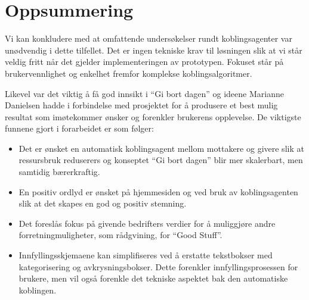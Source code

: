 \section{Oppsummering}
Vi kan konkludere med at omfattende undersøkelser rundt koblingsagenter var unødvendig i dette tilfellet. Det er ingen tekniske krav til løsningen slik at vi står veldig fritt når det gjelder implementeringen av prototypen. Fokuset står på brukervennlighet og enkelhet fremfor komplekse koblingsalgoritmer.

Likevel var det viktig å få god innsikt i ``Gi bort dagen'' og ideene Marianne Danielsen hadde i forbindelse med prosjektet for å produsere et best mulig resultat som imøtekommer ønsker og forenkler brukerens opplevelse. De viktigste funnene gjort i forarbeidet  er som følger:

\begin{itemize}
    \item Det er ønsket en automatisk koblingsagent mellom mottakere og givere slik at ressursbruk reduserers og konseptet ``Gi bort dagen'' blir mer skalerbart, men samtidig bærerkraftig.
    \item En positiv ordlyd er ønsket på hjemmesiden og ved bruk av koblingsagenten slik at det skapes en god og positiv stemning.
    \item Det foreslås fokus på givende bedrifters verdier for å muliggjøre andre forretningmuligheter, som rådgvining, for ``Good Stuff''.
    \item Innfyllingsskjemaene kan simplifiseres ved å erstatte tekstbokser med kategorisering og avkrysningsbokser. Dette forenkler innfyllingsprosessen for brukere, men vil også forenkle det tekniske aspektet bak den automatiske koblingen.
\end{itemize}

